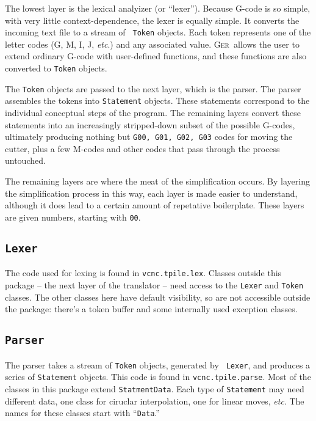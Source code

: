 \documentclass[titlepage,oneside,10pt]{article}
\newcommand{\ger}{\textsc{Ger}}
\begin{document}
The lowest layer is the lexical analyizer (or ``lexer''). Because
G-code is so simple, with very little context-dependence, the lexer is
equally simple. It converts the incoming text file to a stream of {\tt
  Token} objects. Each token represents one of the letter codes (G, M,
I, J, \emph{etc}.) and any associated value. \ger\ allows the user to
extend ordinary G-code with user-defined functions, and these
functions are also converted to {\tt Token} objects.

The {\tt Token} objects are passed to the next layer, which is the
parser. The parser assembles the tokens into {\tt Statement}
objects. These statements correspond to the individual conceptual
steps of the program. The remaining layers convert these statements
into an increasingly stripped-down subset of the possible
G-codes, ultimately producing nothing but {\tt G00, G01, G02, G03}
codes for moving the cutter, plus a few M-codes and other codes that
pass through the process untouched.

The remaining layers are where the meat of the simplification
occurs. By layering the simplification process in this way, each layer
is made easier to understand, although it does lead to a certain
amount of repetative boilerplate. These layers are given numbers,
starting with {\tt 00}.

\subsection{\tt Lexer}

The code used for lexing is found in {\tt vcnc.tpile.lex}. Classes outside
this package -- the next layer of the translator -- need access to the
{\tt Lexer} and {\tt Token} classes. The other classes here have
default visibility, so are not accessible outside the package: there's
a token buffer and some internally used exception classes.

\subsection{\tt Parser}

The parser takes a stream of {\tt Token} objects, generated by {\tt
  Lexer}, and produces a series of {\tt Statement} objects. This code
is found in {\tt vcnc.tpile.parse}. Most of the classes in this
package extend {\tt StatmentData}. Each type of {\tt Statement} may
need different data, one class for ciruclar interpolation, one for
linear moves, \emph{etc}. The names for these classes start with
``{\tt Data}.''
\end{document}
